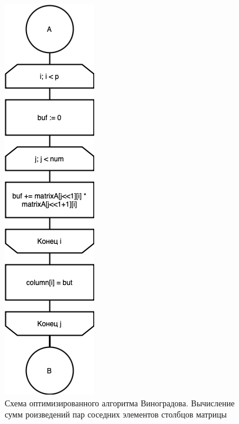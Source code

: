 \begin{figure}[h]
    \centering
    \includegraphics[width=0.3\linewidth]{img/WinogradOptB.jpg}
    \caption{Схема оптимизированного алгоритма Виноградова. Вычисление сумм роизведений 
    пар соседних элементов столбцов матрицы}
    \label{fig:mpr}
\end{figure}

